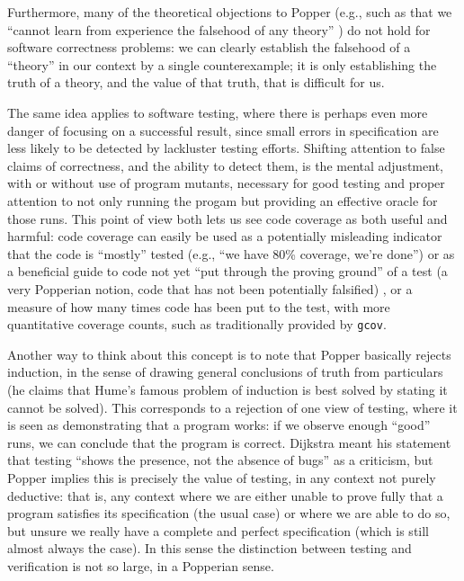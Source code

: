 \documentclass{svjour3}
\begin{document}
Furthermore, many of the theoretical objections to Popper (e.g., such
as that we ``cannot learn from experience the falsehood of any
theory'' \cite{lakatos}) do not hold for software correctness
problems:  we can clearly establish the falsehood of a ``theory'' in
our context by a single counterexample; it is only establishing the
truth of a theory, and the value of that truth, that is difficult for us.

The same idea applies to software testing, where there is perhaps even
more danger of focusing on a successful result, since small errors in
specification are less likely to be detected by lackluster testing
efforts.  Shifting attention to false claims of correctness, and the
ability to detect them, is the mental adjustment, with or without
use of program mutants, necessary for good testing and proper
attention to not only running the progam but providing an effective
oracle \cite{oracleMcMinn} for those runs.  This point of view both
lets us see code coverage \cite{CovDisc} as both useful and harmful:
code coverage can easily be used as a potentially misleading indicator that the
code is ``mostly'' tested (e.g., ``we have 80\% coverage, we're
done'') or as a beneficial guide to code not yet ``put through the
proving ground'' of a test (a very Popperian notion, code that has not
been potentially falsified) \cite{ahmed_testedness}, or a measure of how many times code has
been put to the test, with more quantitative coverage counts, such as
traditionally provided by {\tt gcov}.

Another way to think about this concept is to note that Popper
basically rejects induction, in the sense of drawing general
conclusions of truth from particulars (he claims that Hume's famous
problem of induction \cite{Hume2} is best solved by stating it cannot
be solved).  This corresponds to a rejection of one view of testing,
where it is seen as demonstrating that a program works: if we observe
enough ``good'' runs, we can conclude that the program is correct.
Dijkstra meant his statement that testing ``shows the presence, not
the absence of bugs'' \cite{Dijkstra69} as
a criticism, but Popper implies this is precisely the value of
testing, in any context not purely deductive: that is, any context
where we are either unable to prove fully that a program satisfies its
specification (the usual case) or where we are able to do so, but
unsure we really have a complete and perfect specification (which is
still almost always the case).  In this sense the distinction between
testing and verification is not so large, in a Popperian sense.
\end{document}

